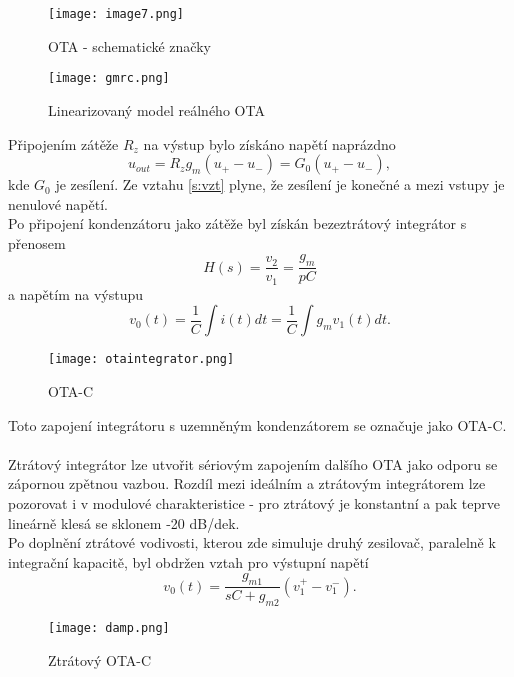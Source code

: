 \begin{figure}[h]
\centering
\texttt{[image: image7.png]}
\caption[OTA - schematické značky]{OTA - schematické značky \cite{11}}
\end{figure}
\begin{figure}[h]
\centering
\texttt{[image: gmrc.png]}
\caption[Linearizovaný model reálného OTA]{Linearizovaný model reálného OTA \cite{12}}
\end{figure}
\noindent Připojením zátěže $R_z$ na výstup bylo získáno napětí naprázdno
\begin{equation}\label{s:vzt}
u_{out} = R_zg_m(u_+ - u_-) = G_0(u_+ - u_-),
\end{equation}
kde $G_0$ je zesílení. Ze vztahu \ref{s:vzt} plyne, že zesílení je konečné a mezi vstupy je nenulové napětí. \\
\noindent Po připojení kondenzátoru jako zátěže byl získán bezeztrátový integrátor s přenosem
\begin{equation}
H(s) = \frac{v_2}{v_1} = \frac{g_m}{pC}
\end{equation}
\noindent a napětím na výstupu
\begin{equation}
v_0(t) = \frac{1}{C}\int i(t)dt = \frac{1}{C}\int g_mv_1(t)dt.
\end{equation}
\begin{figure}[h]
\centering
\texttt{[image: otaintegrator.png]}
\caption[OTA-C]{OTA-C \cite{12} \label{s:GM-C}}
\end{figure}
\noindent Toto zapojení integrátoru s uzemněným kondenzátorem se označuje jako OTA-C.\\
\\
Ztrátový integrátor lze utvořit sériovým zapojením dalšího OTA jako odporu se zápornou zpětnou vazbou. Rozdíl mezi ideálním a ztrátovým integrátorem lze pozorovat i v modulové charakteristice - pro ztrátový je konstantní a pak teprve lineárně klesá se sklonem -20 dB/dek.\\
Po doplnění ztrátové vodivosti, kterou zde simuluje druhý zesilovač, paralelně k integrační kapacitě, byl obdržen vztah pro výstupní napětí
\begin{equation}
v_0(t) = \frac{g_{m1}}{sC + g_{m2}}(v_1^+ - v_{1}^-).\label{s:OTA-INT1}
\end{equation}
\begin{figure}[h]
\centering
\texttt{[image: damp.png]}
\caption[Ztrátový OTA-C]{Ztrátový OTA-C \cite{12} \label{s:OTA-INT}}
\end{figure}
